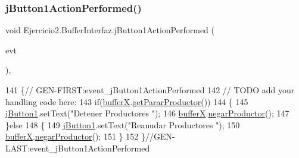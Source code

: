 \subsubsection{\texorpdfstring{j\+Button1\+Action\+Performed()}{jButton1ActionPerformed()}}
{\footnotesize\ttfamily void Ejercicio2.\+Buffer\+Interfaz.\+j\+Button1\+Action\+Performed (\begin{DoxyParamCaption}\item[{java.\+awt.\+event.\+Action\+Event}]{evt }\end{DoxyParamCaption})\hspace{0.3cm}{\ttfamily [inline]}, {\ttfamily [private]}}


\begin{DoxyCode}
141                                                                          \{\textcolor{comment}{//
      GEN-FIRST:event\_jButton1ActionPerformed}
142         \textcolor{comment}{// TODO add your handling code here:}
143         \textcolor{keywordflow}{if}(\mbox{\hyperlink{class_ejercicio2_1_1_buffer_interfaz_a53107ffeb83ad39dffdd24c9a407e67e}{bufferX}}.\mbox{\hyperlink{class_ejercicio2_1_1_buffer_a0ee76aa61a4ad36a541c96a6863944f0}{getPararProductor}}())
144         \{
145             \mbox{\hyperlink{class_ejercicio2_1_1_buffer_interfaz_a1ec51a96e127bf42cda327fbfeb2a518}{jButton1}}.setText(\textcolor{stringliteral}{"Detener Productores "});
146             \mbox{\hyperlink{class_ejercicio2_1_1_buffer_interfaz_a53107ffeb83ad39dffdd24c9a407e67e}{bufferX}}.\mbox{\hyperlink{class_ejercicio2_1_1_buffer_ac99f2fdd7322cc95e1fa807cc7b60476}{negarProductor}}();
147         \}\textcolor{keywordflow}{else}
148         \{
149             \mbox{\hyperlink{class_ejercicio2_1_1_buffer_interfaz_a1ec51a96e127bf42cda327fbfeb2a518}{jButton1}}.setText(\textcolor{stringliteral}{"Reanudar Productores "});
150             \mbox{\hyperlink{class_ejercicio2_1_1_buffer_interfaz_a53107ffeb83ad39dffdd24c9a407e67e}{bufferX}}.\mbox{\hyperlink{class_ejercicio2_1_1_buffer_ac99f2fdd7322cc95e1fa807cc7b60476}{negarProductor}}();
151         \}
152     \}\textcolor{comment}{//GEN-LAST:event\_jButton1ActionPerformed}
\end{DoxyCode}
\mbox{\label{class_ejercicio2_1_1_buffer_interfaz_af46612a912867d6c9824fbf28628ba1f}} 
